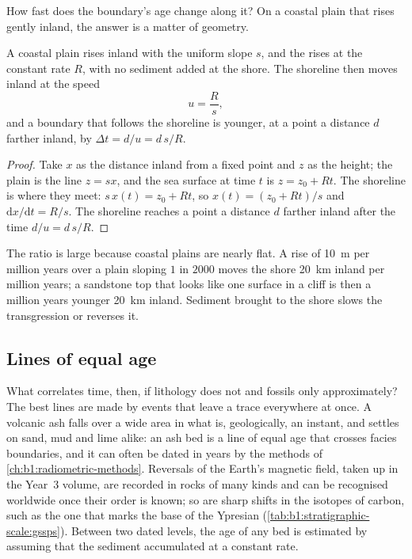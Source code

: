 How fast does the boundary's age change along it? On a coastal plain that rises
gently inland, the answer is a matter of geometry.

\begin{proposition}\label{prop:b1:stratigraphic-scale:transgression}
A coastal plain rises inland with the uniform slope $s$, and the  rises at the constant rate $R$, with no sediment added at the shore. The
shoreline then moves inland at the speed
\[
  u = \frac{R}{s},
\]
and a boundary that follows the shoreline is younger, at a point a distance $d$
farther inland, by $\Delta t = d/u = d\,s/R$.
\end{proposition}

\begin{proof}
Take $x$ as the distance inland from a fixed point and $z$ as the height; the
plain is the line $z = s x$, and the sea surface at time $t$ is
$z = z_0 + R t$. The shoreline is where they meet: $s\,x(t) = z_0 + R t$, so
$x(t) = (z_0 + R t)/s$ and $\mathrm dx/\mathrm dt = R/s$. The shoreline reaches
a point a distance $d$ farther inland after the time $d/u = d\,s/R$.
\end{proof}

The ratio is large because coastal plains are nearly flat. A rise of
\qty{10}{m} per million years over a plain sloping $1$ in $2000$ moves the shore
\qty{20}{km} inland per million years; a sandstone top that looks like one
surface in a cliff is then a million years younger \qty{20}{km} inland. Sediment
brought to the shore slows the transgression or reverses it.

\subsection*{Lines of equal age}

What correlates time, then, if lithology does not and fossils only
approximately? The best lines are made by events that leave a trace everywhere
at once. A volcanic ash falls over a wide area in what is, geologically, an
instant, and settles on sand, mud and lime alike: an ash bed is a line of equal
age that crosses facies boundaries, and it can often be dated in years by the
methods of \cref{ch:b1:radiometric-methods}. Reversals of the Earth's magnetic
field, taken up in the Year~3 volume, are recorded in rocks of many kinds and can
be recognised worldwide once their order is known; so are sharp shifts in the
isotopes of carbon, such as the one that marks the base of the Ypresian
(\cref{tab:b1:stratigraphic-scale:gssps}). Between two
dated levels, the age of any bed is estimated by assuming that the sediment
accumulated at a constant rate.

